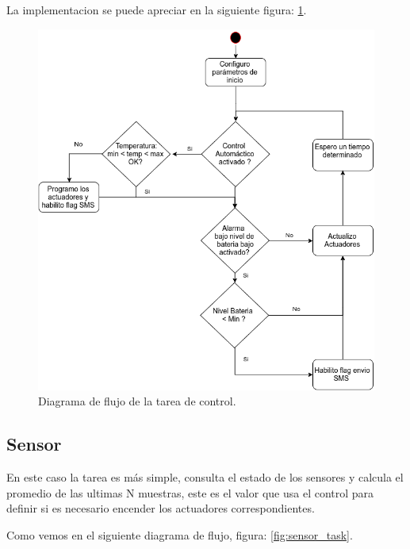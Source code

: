 La implementacion se puede apreciar en la siguiente figura: \ref{fig:control_task}.

\begin{figure}[!htb]
  \centering
  \includegraphics[scale=.5]{./Figures/control_task.png}
  \caption{Diagrama de flujo de la tarea de control.}
  \label{fig:control_task}
\end{figure}


\subsection*{Sensor}
 En este caso la tarea es más simple, consulta el estado de los sensores y calcula el promedio de las ultimas N muestras, este es el valor que usa el control para definir si es necesario encender los actuadores correspondientes.

 Como vemos en el siguiente diagrama de flujo, figura: \ref{fig:sensor_task}.

